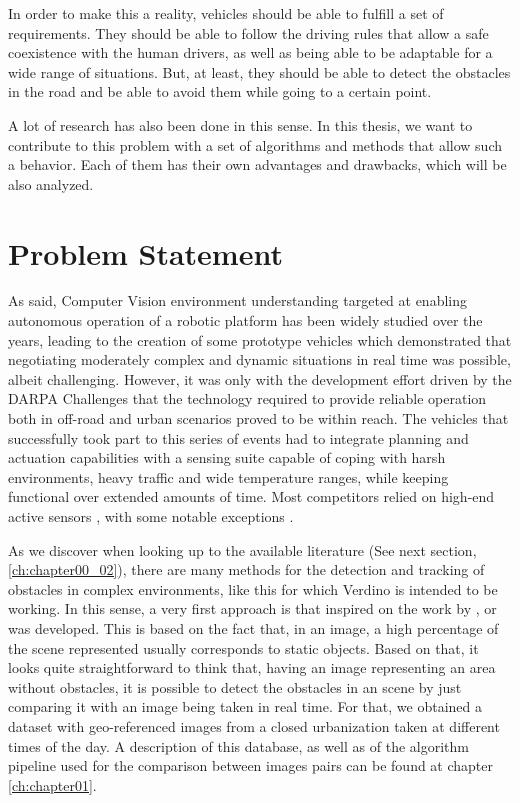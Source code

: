In order to make this a reality, vehicles should be able to fulfill a set of requirements. They should be able to follow the driving rules that allow a safe coexistence with the human drivers, as well as being able to be adaptable for a wide range of situations. But, at least, they should be able to detect the obstacles in the road and be able to avoid them while going to a certain point. 

A lot of research has also been done in this sense. In this thesis, we want to contribute to this problem with a set of algorithms and methods that allow such a behavior. Each of them has their own advantages and drawbacks, which will be also analyzed. 

\section{Problem Statement}\label{ch:chapter00_01}

As said, Computer Vision environment understanding targeted at enabling autonomous operation of a robotic platform has been widely studied over the years, leading to the creation of some prototype vehicles \cite{Maurer1996,Pomerleau1996,Broggi1999} which demonstrated that negotiating moderately complex and dynamic situations in real time was possible, albeit challenging. However, it was only with the development effort driven by the DARPA Challenges \cite{Buehler2007, Buehler2009} that the technology required to provide reliable operation both in off-road and urban scenarios proved to be within reach.
The vehicles that successfully took part to this series of events had to integrate planning and actuation capabilities with a sensing suite capable of coping with harsh environments, heavy traffic and wide temperature ranges, while keeping functional over extended amounts of time. Most competitors relied on high-end active sensors \cite{Urmson2008, Montemerlo2008, Bacha2008, Kammel2008}, with some notable exceptions \cite{Broggi2006, Broggi2010}. 

As we discover when looking up to the available literature (See next section, \ref{ch:chapter00_02}), there are many methods for the detection and tracking of obstacles in complex environments, like this for which Verdino is intended to be working. In this sense, a very first approach is that inspired on the work by \cite{primdahl2005change},  \cite{diego2011video} or \cite{vallespi2012prior} was developed. This is based on the fact that, in an image, a high percentage of the scene represented usually corresponds to static objects. Based on that, it looks quite straightforward to think that, having an image representing an area without obstacles, it is possible to detect the obstacles in an scene by just comparing it with an image being taken in real time. For that, we obtained a dataset with geo-referenced images from a closed urbanization taken at different times of the day. A description of this database, as well as of the algorithm pipeline used for the comparison between images pairs can be found at chapter \ref{ch:chapter01}.

